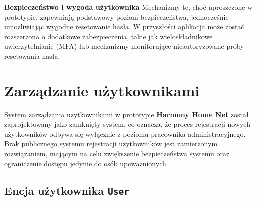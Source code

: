 \noindent \textbf{Bezpieczeństwo i wygoda użytkownika}\newline 
Mechanizmy te, choć uproszczone w prototypie, zapewniają podstawowy poziom bezpieczeństwa, jednocześnie umożliwiając wygodne resetowanie hasła. W przyszłości aplikacja może zostać rozszerzona o dodatkowe zabezpieczenia, takie jak wieloskładnikowe uwierzytelnianie (MFA) lub mechanizmy monitorujące nieautoryzowane próby resetowania hasła.


\section{Zarządzanie użytkownikami}

System zarządzania użytkownikami w prototypie \textbf{Harmony Home Net} został zaprojektowany jako zamknięty system, co oznacza, że proces rejestracji nowych użytkowników odbywa się wyłącznie z poziomu pracownika administracyjnego. Brak publicznego systemu rejestracji użytkowników jest zamierzonym rozwiązaniem, mającym na celu zwiększenie bezpieczeństwa systemu oraz ograniczenie dostępu jedynie do osób upoważnionych. 

\subsection{Encja użytkownika \texttt{User}}

